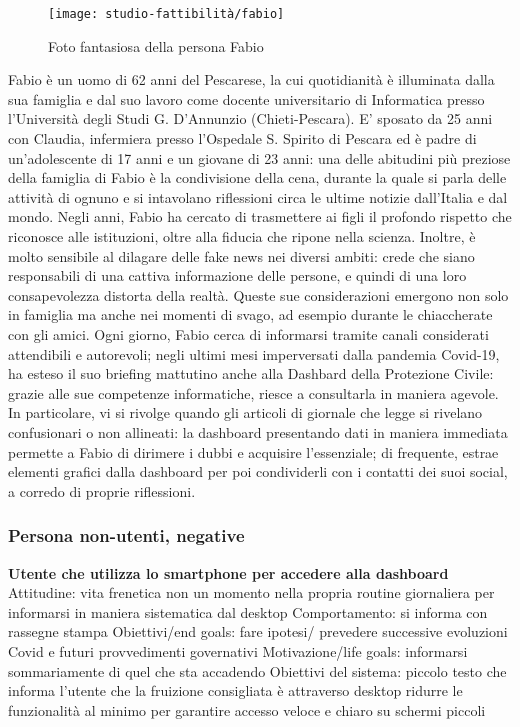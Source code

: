 \begin{wrapfigure}{r}{8cm}
    \texttt{[image: studio-fattibilità/fabio]}
    \caption{Foto fantasiosa della persona Fabio}
\end{wrapfigure}

Fabio è un uomo di 62 anni del Pescarese, la cui quotidianità è illuminata dalla sua famiglia e dal suo lavoro come docente universitario di Informatica presso l'Università degli Studi G. D'Annunzio (Chieti-Pescara).
E' sposato da 25 anni con Claudia, infermiera presso l'Ospedale S. Spirito di Pescara ed è padre di un'adolescente di 17 anni e un giovane di 23 anni: una delle abitudini più preziose della famiglia di Fabio è la condivisione della cena, durante la quale si parla delle attività di ognuno e si intavolano riflessioni circa le ultime notizie dall'Italia e dal mondo.
Negli anni, Fabio ha cercato di trasmettere ai figli il profondo rispetto che riconosce alle istituzioni, oltre alla fiducia che ripone nella scienza. Inoltre, è molto sensibile al dilagare delle fake news nei diversi ambiti: crede che siano responsabili di una cattiva informazione delle persone, e quindi di una loro consapevolezza distorta della realtà. 
Queste sue considerazioni emergono non solo in famiglia ma anche nei momenti di svago, ad esempio durante le chiaccherate con gli amici.
Ogni giorno, Fabio cerca di informarsi tramite canali considerati attendibili e autorevoli; negli ultimi mesi imperversati dalla pandemia Covid-19, ha esteso il suo briefing mattutino anche alla Dashbard della Protezione Civile: grazie alle sue competenze informatiche, riesce a consultarla in maniera agevole. In particolare, vi si rivolge quando gli articoli di giornale che legge si rivelano confusionari o non allineati: la dashboard presentando dati in maniera immediata permette a Fabio di dirimere i dubbi e acquisire l'essenziale; di frequente, estrae elementi grafici dalla dashboard per poi condividerli con i contatti dei suoi social, a corredo di proprie riflessioni.


\subsubsection*{Persona non-utenti, negative}
\textbf{Utente che utilizza lo smartphone per accedere alla dashboard}
	Attitudine:
		vita frenetica
		non un momento nella propria routine giornaliera per informarsi in maniera sistematica dal desktop
	Comportamento: 
		si informa con rassegne stampa
	Obiettivi/end goals: 
		fare ipotesi/ prevedere successive evoluzioni Covid e futuri provvedimenti governativi
	Motivazione/life goals: 
		informarsi sommariamente di quel che sta accadendo
	Obiettivi del sistema:
		piccolo testo che informa l'utente che la fruizione consigliata è attraverso desktop
ridurre le funzionalità al minimo per garantire accesso veloce e chiaro su schermi piccoli

